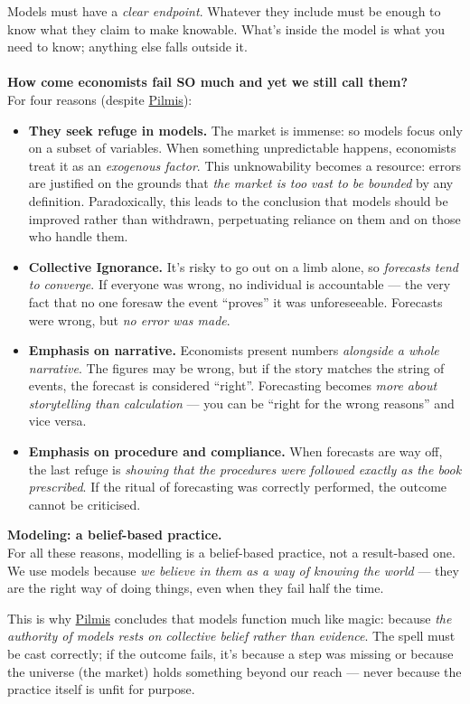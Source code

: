 \documentclass[a4paper,12pt]{article}
\begin{document}
Models must have a \emph{clear endpoint}. Whatever they include must be enough to know what they claim to make knowable. What's inside the model is what you need to know; anything else falls outside it. \\
\\
\noindent \textbf{How come economists fail SO much and yet we still call them?} \\
\noindent For four reasons (despite \underline{Pilmis}):
\begin{itemize}
	\item \textbf{They seek refuge in models.} The market is immense: so models focus only on a subset of variables. When something unpredictable happens, economists treat it as an \emph{exogenous factor}. This unknowability becomes a resource:  errors are justified on the grounds that \emph{the market is too vast to be bounded} by any definition. Paradoxically, this leads to the conclusion that models should be improved rather than withdrawn, perpetuating reliance on them and on those who handle them.
	\item \textbf{Collective Ignorance.} It's risky to go out on a limb alone, so \emph{forecasts tend to converge}. If everyone was wrong, no individual is accountable --- the very fact that no one foresaw the event ``proves'' it was unforeseeable. Forecasts were wrong, but \emph{no error was made}.
	\item \textbf{Emphasis on narrative.} Economists present numbers \emph{alongside a whole narrative}. The figures may be wrong, but if the story matches the string of events, the forecast is considered ``right''. Forecasting becomes \emph{more about storytelling than calculation} --- you can be ``right for the wrong reasons'' and vice versa.
	\item \textbf{Emphasis on procedure and compliance.} When forecasts are way off, the last refuge is \emph{showing that the procedures were followed exactly as the book prescribed}. If the ritual of forecasting was correctly performed, the outcome cannot be criticised.
\end{itemize}
\noindent \textbf{Modeling: a belief-based practice.} \\
\noindent For all these reasons, modelling is a belief-based practice, not a result-based one. We use models because \emph{we believe in them as a way of knowing the world} --- they are the right way of doing things, even when they fail half the time.

This is why \underline{Pilmis} concludes that models function much like magic: because \emph{the authority of models rests on collective belief rather than evidence}. The spell must be cast correctly; if the outcome fails, it's because a step was missing or because the universe (the market) holds something beyond our reach --- never because the practice itself is unfit for purpose.
\end{document}
